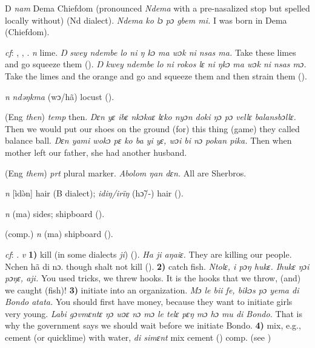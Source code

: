 \begin{letter}{D}
 \textit{nam} Dema Chiefdom (pronounced \textit{Ndema} with a pre-nasalized stop but spelled locally without) (Nd dialect). \textit{Ndema ko lɔ pɔ gbem mi.} I was born in Dema (Chiefdom). 

 \textit{cf}: , , . \textit{n} lime. \textit{Ŋ swey ndembe lo ni ŋ kɔ ma wɔk ni nsas ma.} Take these limes and go squeeze them (\citealt{Pichl1967}). \textit{Ŋ kwey ndembe lo ni rokos lɛ ni ŋkɔ ma wɔk ni nsas mɔ.} Take the limes and the orange and go and squeeze them and then strain them (\citealt{Pichl1967}). 

 \textit{n} \textit{ndəŋkma} (wɔ/hã) locust (\citealt{Pichl1967}). 

 (Eng \textit{then}) \textit{temp} then. \textit{Dɛn yɛ ibɛ nkɔkaɛ lɛko nyɔn doki ŋɔ pɔ vellɛ balansbɔllɛ.} Then we would put our shoes on the ground (for) this thing (game) they called balance ball. \textit{Dɛn yami wokɔ pɛ ko ba yi yɛ, wɔi bi nɔ pokan pika.} Then when mother left our father, she had another husband.

 (Eng \textit{them}) \textit{prt} plural marker. \textit{Abolom ŋan dɛn.} All are Sherbros.

 \textit{n} [ìdə̀n] hair (B dialect); \textit{idiŋ/irïŋ} (hɔ̃/-) hair (\citealt{Pichl1967}). 

 \textit{n} (ma) sides; shipboard (\citealt{Pichl1967}). 

 (comp.) \textit{n} (ma) shipboard (\citealt{Pichl1967}). 

 \textit{cf}: . \textit{v} \textbf{1)} kill (in some dialects \textit{ji}) (\citealt{Pichl1967}). \textit{Ha ji aŋaiɛ.} They are killing our people. Nchen hã di nɔ. though shalt not kill (\citealt{Pichl1967}). \textbf{2)} catch fish. \textit{Ntolɛ, i pɔŋ hukɛ. Ihukɛ ŋɔi pɔŋɛ, aji.} You used tricks, we threw hooks. It is the hooks that we throw, (and) we caught (fish)! \textbf{3)} initiate into an organization. \textit{Mɔ le bii fe, bikɔs pɔ yema di Bondo atata.} You should first have money, because they want to initiate girls very young. \textit{Labi gɔvmɛntɛ ŋɔ wɔɛ nɔ mɔ le telɛ pɛŋ mɔ hɔ mu di Bondo.} That is why the government says we should wait before we initiate Bondo. \textbf{4)} mix, e.g., cement (or quicklime) with water, \textit{di simɛnt} mix cement (\citealt{Pichl1967}) comp.  (see ) 


\end{letter}
